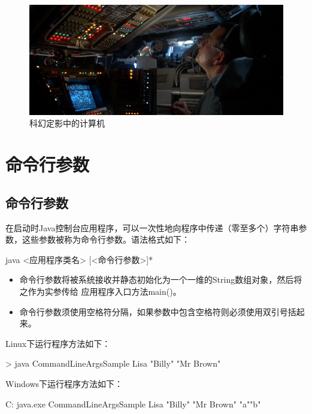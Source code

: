 \begin{figure}[htb]
\centering
\includegraphics[width=\textwidth]{images/Terminal-application-programming/fig-Al012.png}
\caption{科幻定影中的计算机}
\label{fig:Al012}
\end{figure}

\section{命令行参数}

\subsection{命令行参数}

在启动时Java控制台应用程序，可以一次性地向程序中传递（零至多个）字符串参
数，这些参数被称为命令行参数。语法格式如下：

\begin{shCode}
  java <应用程序类名> [<命令行参数>]*
\end{shCode}


\begin{itemize}\kai
\item 命令行参数将被系统接收并静态初始化为一个一维的String数组对象，然后将之作为实参传给
  应用程序入口方法main()。
\item 命令行参数须使用空格符分隔，如果参数中包含空格符则必须使用双引号括起来。
\end{itemize}



Linux下运行程序方法如下：

\begin{shCode}
  > java CommandLineArgsSample Lisa "Billy" "Mr Brown"
\end{shCode}

Windows下运行程序方法如下：

\begin{shCode}
  C:\> java.exe CommandLineArgsSample Lisa "Billy" "Mr Brown" "a""b" 
\end{shCode}

